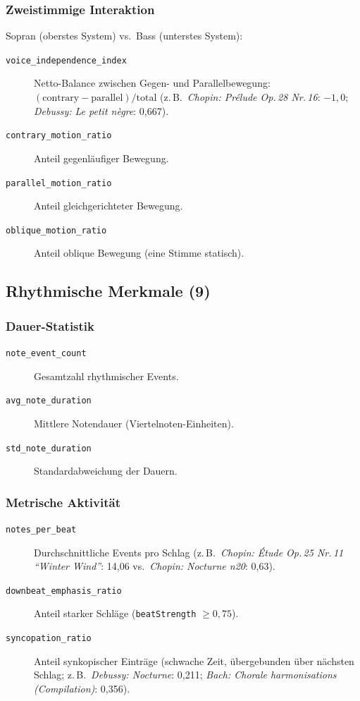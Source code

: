 \documentclass[10pt,a4paper]{article}
\theoremstyle{definition}
\begin{document}
\subsubsection*{Zweistimmige Interaktion}
Sopran (oberstes System) vs.\ Bass (unterstes System):
\begin{description}
    \item[\texttt{voice\_independence\_index}] Netto-Balance zwischen Gegen- und Parallelbewegung: $(\text{contrary}  - \text{parallel}) / \text{total}$ (z.\,B.\ \emph{Chopin: Prélude Op.\,28 Nr.\,16}: $-1{,}0$; \emph{Debussy: Le petit nègre}: 0{,}667).
    
    \item[\texttt{contrary\_motion\_ratio}] Anteil gegenläufiger Bewegung.
    
    \item[\texttt{parallel\_motion\_ratio}] Anteil gleichgerichteter Bewegung.
    
    \item[\texttt{oblique\_motion\_ratio}] Anteil oblique Bewegung (eine Stimme statisch).
\end{description}

\subsection{Rhythmische Merkmale (9)}

\subsubsection*{Dauer-Statistik}
\begin{description}
    \item[\texttt{note\_event\_count}] Gesamtzahl rhythmischer Events.
    
    \item[\texttt{avg\_note\_duration}] Mittlere Notendauer (Viertelnoten-Einheiten).
    
    \item[\texttt{std\_note\_duration}] Standardabweichung der Dauern.
\end{description}

\subsubsection*{Metrische Aktivität}
\begin{description}
    \item[\texttt{notes\_per\_beat}] Durchschnittliche Events pro Schlag (z.\,B.\ \emph{Chopin: Étude Op.\,25 Nr.\,11 \enquote{Winter Wind}}: 14{,}06 vs.\ \emph{Chopin: Nocturne n20}: 0{,}63).
    
    \item[\texttt{downbeat\_emphasis\_ratio}] Anteil starker Schläge (\texttt{beatStrength} $\geq 0{,}75$).
    
    \item[\texttt{syncopation\_ratio}] Anteil synkopischer Einträge (schwache Zeit, übergebunden über nächsten Schlag; z.\,B.\ \emph{Debussy: Nocturne}: 0{,}211; \emph{Bach: Chorale harmonisations (Compilation)}: 0{,}356).
\end{description}
\end{document}
